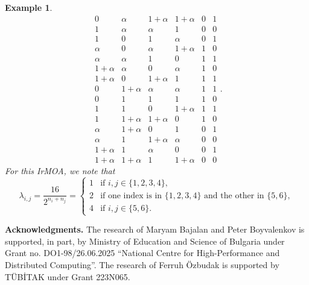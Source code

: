 \documentclass[11pt]{article}
\newtheorem{Example}[Theorem]{Example}
\newtheorem{Definition and Notation}[Theorem]{Definition and Notation}
\begin{document}
\begin{Example}
$$\begin{array}{cccccc}
0 & \alpha & 1+\alpha & 1+\alpha & 0 & 1\\
1 & \alpha & \alpha & 1 & 0 & 0\\
1 & 0 & 1 & \alpha & 0 & 1\\
\alpha & 0 & \alpha & 1+\alpha & 1 & 0\\
\alpha & \alpha & 1 & 0 & 1 & 1\\
1+\alpha & \alpha & 0 & \alpha & 1 & 0\\
1+\alpha & 0 & 1+\alpha & 1 & 1 & 1\\
0 & 1+\alpha & \alpha & \alpha & 1 & 1\\
0 & 1 & 1 & 1 & 1 & 0\\
1 & 1 & 0 & 1+\alpha & 1 & 1\\
1 & 1+\alpha & 1+\alpha & 0 & 1 & 0\\
\alpha & 1+\alpha & 0 & 1 & 0 & 1\\
\alpha & 1 & 1+\alpha & \alpha & 0 & 0\\
1+\alpha & 1 & \alpha & 0 & 0 & 1\\
1+\alpha & 1+\alpha & 1 & 1+\alpha & 0 & 0
\end{array}.
$$
For this IrMOA, we note that 
$$
\lambda_{i,j} = \frac{16}{2^{n_i+n_j}} = 
\begin{cases} 
1 & \text{if } i, j \in \{1, 2, 3, 4\}, \\ 
2 & \text{if one index is in } \{1, 2, 3, 4\} \text{ and the other in } \{5, 6\}, \\ 
4 & \text{if } i, j\in \{5, 6\}. 
\end{cases}
$$
\end{Example}

\medskip

{\bf Acknowledgments.} The research of Maryam Bajalan and Peter Boyvalenkov is supported, in part, by Ministry of Education and Science of Bulgaria under Grant no. DO1-98/26.06.2025 “National Centre for High-Performance and Distributed Computing”. The research of Ferruh \"{O}zbudak is supported by T\"{U}B\.{I}TAK under Grant 223N065.
\end{document}
